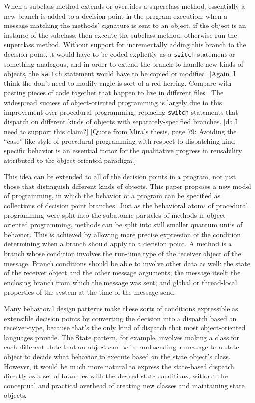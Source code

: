\documentclass{article}
\newcommand{\code}[1]{\texttt{#1}}
\begin{document}
When a subclass method extends or overrides a superclass method,
essentially a new branch is added to a decision point in the program
execution: when a message matching the methods' signature is sent to
an object, if the object is an instance of the subclass, then execute
the subclass method, otherwise run the superclass method.  Without
support for incrementally adding this branch to the decision point, it
would have to be coded explicitly as a \code{switch} statement or
something analogous, and in order to extend the branch to handle new
kinds of objects, the \code{switch} statement would have to be copied
or modified.
[Again, I think the don't-need-to-modify angle is sort of a red
herring.  Compare with pasting pieces of code together that happen to
live in different files.]
The widespread success of object-oriented programming is largely due
to this improvement over procedural programming, replacing
\code{switch} statements that dispatch on different kinds of objects
with separately-specified branches.
[do I need to support this claim?]
[Quote from Mira's thesis, page 79:
Avoiding the ``case''-like style of procedural programming with
respect to dispatching kind-specific behavior is an essential factor
for the qualitative progress in reusability attributed to the
object-oriented paradigm.]

This idea can be extended to all of the decision points in a program,
not just those that distinguish different kinds of objects.  This
paper proposes a new model of programming, in which the behavior of a
program can be specified as collections of decision point branches.
Just as the behavioral atoms of procedural programming were split into
the subatomic particles of methods in object-oriented programming,
methods can be split into still smaller quantum units of behavior.
This is achieved by allowing more precise expression of the condition
determining when a branch should apply to a decision point.  A method
is a branch whose condition involves the run-time type of the receiver
object of the message.  Branch conditions should be able to involve
other data as well: the state of the receiver object and the other
message arguments; the message itself; the enclosing branch from which
the message was sent; and global or thread-local properties of the
system at the time of the message send.

Many behavioral design patterns \cite{design-patterns} make these
sorts of conditions expressible as extensible decision points by
converting the decision into a dispatch based on receiver-type,
because that's the only kind of dispatch that most object-oriented
languages provide.  The State pattern, for example, involves making a
class for each different state that an object can be in, and sending a
message to a state object to decide what behavior to execute based on
the state object's class.  However, it would be much more natural to
express the state-based dispatch directly as a set of branches with
the desired state conditions, without the conceptual and practical
overhead of creating new classes and maintaining state objects.
\end{document}

